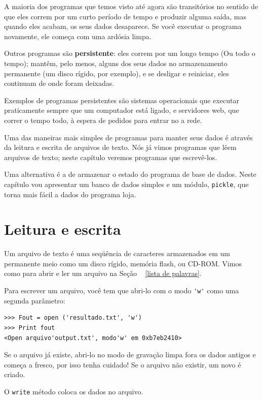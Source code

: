 \documentclass[10pt]{book}
\begin{document}
\begin{exercise}
\begin{v erbatim}
A maioria dos programas que temos visto até agora são transitórios no
sentido de que eles correm por um curto período de tempo e produzir alguma saída,
mas quando eles acabam, os seus dados desaparece. Se você executar o programa
novamente, ele começa com uma ardósia limpa.

Outros programas são {\bf persistente}: eles correm por um longo tempo
(Ou todo o tempo); mantêm, pelo menos, alguns dos seus dados
no armazenamento permanente (um disco rígido, por exemplo), e
se desligar e reiniciar, eles continuam de onde foram deixadas.

Exemplos de programas persistentes são sistemas operacionais que
executar praticamente sempre que um computador está ligado, e servidores web,
que correr o tempo todo, à espera de pedidos para entrar no
a rede.

Uma das maneiras mais simples de programas para manter seus dados
é através da leitura e escrita de arquivos de texto. Nós já vimos
programas que lêem arquivos de texto; neste capítulo veremos programas
que escrevê-los.

Uma alternativa é a de armazenar o estado do programa de base de dados.
Neste capítulo vou apresentar um banco de dados simples e um módulo,
{\tt pickle}, que torna mais fácil a dados do programa loja.


\section{Leitura e escrita}

Um arquivo de texto é uma seqüência de caracteres armazenados em um permanente
meio como um disco rígido, memória flash, ou CD-ROM. Vimos como
para abrir e ler um arquivo na Seção ~ \ref {lista de palavras}.

Para escrever um arquivo, você tem que abri-lo com o modo \verb "'w'" como uma segunda
parâmetro:

\begin{verbatim}
>>> Fout = open ('resultado.txt', 'w')
>>> Print fout
<Open arquivo'output.txt', modo'w' em 0xb7eb2410>
\end{verbatim}
%
Se o arquivo já existe, abri-lo no modo de gravação limpa fora
os dados antigos e começa a fresco, por isso tenha cuidado!
Se o arquivo não existir, um novo é criado.

O {\tt write} método coloca os dados no arquivo.


\end{v erbatim}
\end{exercise}
\end{document}

